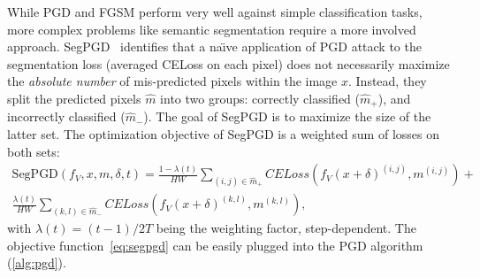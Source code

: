 While PGD and FGSM perform very well against simple classification tasks, more complex problems like semantic segmentation require a more involved approach. SegPGD~\cite{segpgd} identifies that a na\"{\i}ve application of PGD attack to the segmentation loss (averaged CELoss on each pixel) does not necessarily maximize the \textit{absolute number} of mis-predicted pixels within the image $x$. Instead, they split the predicted pixels $\hat{m}$ into two groups: correctly classified ($\hat{m}_+$), and incorrectly classified ($\hat{m}_-$). The goal of SegPGD is to maximize the size of the latter set. The optimization objective of SegPGD is a weighted sum of losses on both sets:
\begin{equation}
    \begin{aligned}
        \text{SegPGD}(f_V,x,m,\delta,t)=\frac{1-\lambda(t)}{HW}\sum_{(i,j)\in \hat{m}_+}CELoss(f_V(x+\delta)^{(i,j)},m^{(i,j)})+\\
        \frac{\lambda(t)}{HW}\sum_{(k,l)\in \hat{m}_-}CELoss(f_V(x+\delta)^{(k,l)},m^{(k,l)})\text{,}
    \end{aligned}
    \label{eq:segpgd}
\end{equation}
with $\lambda(t)=(t-1)/2T$ being the weighting factor, step-dependent. The objective function~\cref{eq:segpgd} can be easily plugged into the PGD algorithm (\cref{alg:pgd}).
